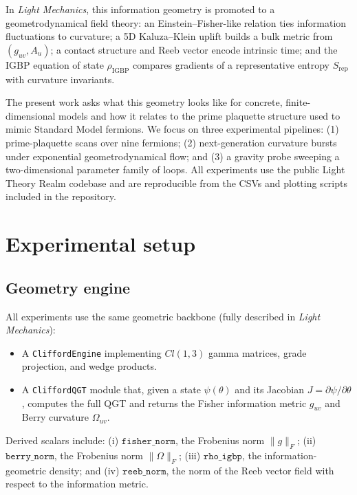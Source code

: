 \documentclass[12pt]{article}
\begin{document}
In \emph{Light Mechanics}, this information geometry is promoted to a geometrodynamical field theory: an Einstein--Fisher-like relation ties information fluctuations to curvature; a 5D Kaluza--Klein uplift builds a bulk metric from $(g_{uv}, A_u)$; a contact structure and Reeb vector encode intrinsic time; and the IGBP equation of state $\rho_{\mathrm{IGBP}}$ compares gradients of a representative entropy $S_{\mathrm{rep}}$ with curvature invariants.

The present work asks what this geometry looks like for concrete, finite-dimensional models and how it relates to the prime plaquette structure used to mimic Standard Model fermions. We focus on three experimental pipelines: (1) prime-plaquette scans over nine fermions; (2) next-generation curvature bursts under exponential geometrodynamical flow; and (3) a gravity probe sweeping a two-dimensional parameter family of loops. All experiments use the public Light Theory Realm codebase and are reproducible from the CSVs and plotting scripts included in the repository.

\section{Experimental setup}
\subsection{Geometry engine}
All experiments use the same geometric backbone (fully described in \emph{Light Mechanics}):
\begin{itemize}
    \item A \texttt{CliffordEngine} implementing $Cl(1,3)$ gamma matrices, grade projection, and wedge products.
    \item A \texttt{CliffordQGT} module that, given a state $\psi(\theta)$ and its Jacobian $J = \partial\psi/\partial\theta$, computes the full QGT and returns the Fisher information metric $g_{uv}$ and Berry curvature $\Omega_{uv}$.
\end{itemize}

Derived scalars include: (i) $\texttt{fisher\_norm}$, the Frobenius norm $\lVert g\rVert_F$; (ii) $\texttt{berry\_norm}$, the Frobenius norm $\lVert\Omega\rVert_F$; (iii) $\texttt{rho\_igbp}$, the information-geometric density; and (iv) $\texttt{reeb\_norm}$, the norm of the Reeb vector field with respect to the information metric.
\end{document}
